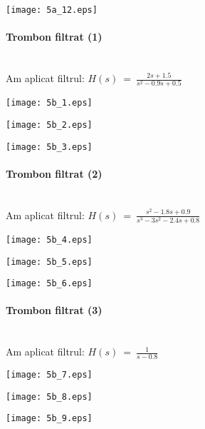 \documentclass[12pt,english]{article}
\newcommand{\myparagraph}[1]{\paragraph{#1}\mbox{}\\}
\begin{document}
\begin{center}
\texttt{[image: 5a\_12.eps]}
\end{center}
\pagebreak

\myparagraph {Trombon filtrat (1)}
Am aplicat filtrul: $\displaystyle H( s) \ =\ \frac{2s+1.5}{s^{2} -0.9s+0.5}$

\begin{center}
\texttt{[image: 5b\_1.eps]}
\end{center}

\begin{center}
\texttt{[image: 5b\_2.eps]}
\end{center}

\begin{center}
\texttt{[image: 5b\_3.eps]}
\end{center}
\pagebreak

\myparagraph {Trombon filtrat (2)}
Am aplicat filtrul: $\displaystyle H( s) \ =\ \frac{s^{2} -1.8s+0.9}{s^{3} -3s^{2} -2.4s+0.8}$

\begin{center}
\texttt{[image: 5b\_4.eps]}
\end{center}

\begin{center}
\texttt{[image: 5b\_5.eps]}
\end{center}

\begin{center}
\texttt{[image: 5b\_6.eps]}
\end{center}
\pagebreak

\myparagraph {Trombon filtrat (3)}
Am aplicat filtrul: $\displaystyle H( s) \ =\ \frac{1}{s-0.8}$

\begin{center}
\texttt{[image: 5b\_7.eps]}
\end{center}

\begin{center}
\texttt{[image: 5b\_8.eps]}
\end{center}

\begin{center}
\texttt{[image: 5b\_9.eps]}
\end{center}
\pagebreak
\end{document}
